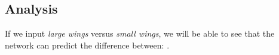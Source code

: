 

\subsection{Analysis}
If we input \textit{large wings} versus \textit{small wings}, we will be able to see that the network can predict the difference between: . 
